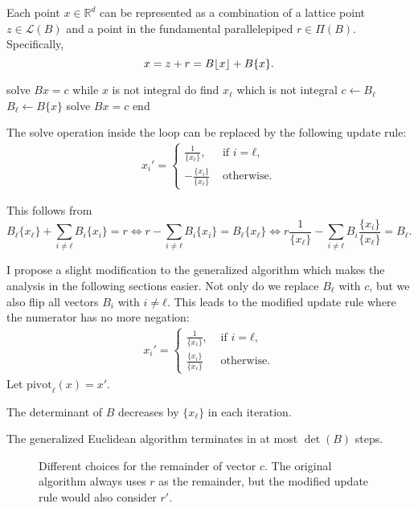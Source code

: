 Each point $x ∈ ℝ^d$ can be represented as a combination of a lattice point $z
∈ \mathcal{L}(B)$ and a point in the fundamental parallelepiped $r ∈ \Pi(B)$.
Specifically,
\[
  x = z + r = B\lfloor x\rfloor + B\{x\}.
\]

\begin{Pseudocode}[caption={The Generalized Euclidean Algorithm.}]
solve $Bx = c$
while $x$ is not integral do
  find $x_ℓ$ which is not integral
  $c ← B_ℓ$
  $B_ℓ ← B\{x\}$
  solve $Bx = c$
end
\end{Pseudocode}

The solve operation inside the loop can be replaced by the following update
rule:
\begin{align*}
  x_i' =
  \begin{cases}
    \frac{1}{\{x_ℓ\}},  & \text{ if } i = ℓ, \\
    -\frac{\{x_i\}}{\{x_ℓ\}} & \text{ otherwise.}
  \end{cases}
\end{align*}

This follows from
\[
  B_ℓ \{x_ℓ\} + \sum_{i ≠ ℓ} B_i \{x_i\} = r
  \iff
  r - \sum_{i ≠ ℓ} B_i \{x_i\} = B_ℓ \{x_ℓ\}
  \iff
  r \frac{1}{\{x_ℓ\}} - \sum_{i ≠ ℓ} B_i \frac{\{x_i\}}{\{x_ℓ\}} = B_ℓ.
\]

I propose a slight modification to the generalized algorithm
which makes the analysis in the following sections easier.
Not only do we replace $B_ℓ$ with $c$,
but we also flip all vectors $B_i$ with $i ≠ ℓ$.
This leads to the modified update rule
where the numerator has no more negation:
\begin{align*}
  x_i' =
  \begin{cases}
    \frac{1}{\{x_ℓ\}},  & \text{ if } i = ℓ, \\
    \frac{\{x_i\}}{\{x_ℓ\}} & \text{ otherwise.}
  \end{cases}
\end{align*}
Let $\mathrm{pivot}_ℓ(x) = x'$.

\begin{lemma}
  The determinant of $B$ decreases by $\{x_ℓ\}$ in each iteration.
\end{lemma}

\begin{theorem}
  The generalized Euclidean algorithm terminates in at most $\det(B)$ steps.
\end{theorem}

\begin{figure}[t]
  \centering
  
  \caption{
    Different choices for the remainder of vector $c$. The original algorithm
    always uses $r$ as the remainder, but the modified update rule would also consider $r'$.}
\end{figure}

